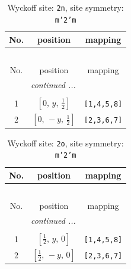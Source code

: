 \documentclass[fleqn,8pt]{jsarticle}
\begin{document}
\begin{longtable}{ccc}
\caption{Wyckoff site: {\tt 2n}, site symmetry: {\tt m'2'm}}
 \\
 \hline \hline
No. & position & mapping \\ \hline \endfirsthead

\multicolumn{2}{l}{\tablename\ \thetable{}} \\
 \hline \hline
No. & position & mapping \\ \hline \endhead

 \hline \hline
\multicolumn{2}{r}{\footnotesize\it continued ...} \\ \endfoot

 \hline \hline
\multicolumn{2}{r}{} \\ \endlastfoot

1 & $\left[ 0,\, y,\, \frac{1}{2} \right]$ & {\tt [1,4,5,8]} \\ \hline
2 & $\left[ 0,\, - y,\, \frac{1}{2} \right]$ & {\tt [2,3,6,7]} \\
\end{longtable}
\renewcommand{\arraystretch}{1.2}
\begin{longtable}{ccc}
\caption{Wyckoff site: {\tt 2o}, site symmetry: {\tt m'2'm}}
 \\
 \hline \hline
No. & position & mapping \\ \hline \endfirsthead

\multicolumn{2}{l}{\tablename\ \thetable{}} \\
 \hline \hline
No. & position & mapping \\ \hline \endhead

 \hline \hline
\multicolumn{2}{r}{\footnotesize\it continued ...} \\ \endfoot

 \hline \hline
\multicolumn{2}{r}{} \\ \endlastfoot

1 & $\left[ \frac{1}{2},\, y,\, 0 \right]$ & {\tt [1,4,5,8]} \\ \hline
2 & $\left[ \frac{1}{2},\, - y,\, 0 \right]$ & {\tt [2,3,6,7]} \\
\end{longtable}
\renewcommand{\arraystretch}{1.2}
\end{document}
